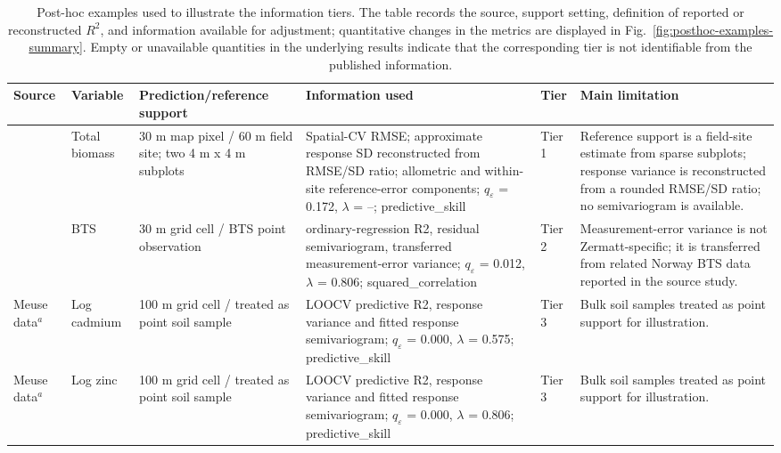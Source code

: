 \begin{table}[t]
\centering
\footnotesize
\caption{Post-hoc examples used to illustrate the information tiers. The table records the source, support setting, definition of reported or reconstructed $R^2$, and information available for adjustment; quantitative changes in the metrics are displayed in Fig.~\ref{fig:posthoc-examples-summary}. Empty or unavailable quantities in the underlying results indicate that the corresponding tier is not identifiable from the published information.}
\label{tab:posthoc-examples-overview}
\begin{tabular}{p{} p{} p{} p{} p{} p{}}
\hline
Source & Variable & Prediction/reference support & Information used & Tier & Main limitation \\
\hline
\citet{zandler2015dwarf} & Total biomass & 30 m map pixel / 60 m field site; two 4 m x 4 m subplots & Spatial-CV RMSE; approximate response SD reconstructed from RMSE/SD ratio; allometric and within-site reference-error components; $q_{\varepsilon}$ = 0.172, $\lambda$ = --; predictive\_skill & Tier 1 & Reference support is a field-site estimate from sparse subplots; response variance is reconstructed from a rounded RMSE/SD ratio; no semivariogram is available. \\
\citet{brenning2005bts} & BTS & 30 m grid cell / BTS point observation & ordinary-regression R2, residual semivariogram, transferred measurement-error variance; $q_{\varepsilon}$ = 0.012, $\lambda$ = 0.806; squared\_correlation & Tier 2 & Measurement-error variance is not Zermatt-specific; it is transferred from related Norway BTS data reported in the source study. \\
Meuse data$^{a}$ & Log cadmium & 100 m grid cell / treated as point soil sample & LOOCV predictive R2, response variance and fitted response semivariogram; $q_{\varepsilon}$ = 0.000, $\lambda$ = 0.575; predictive\_skill & Tier 3 & Bulk soil samples treated as point support for illustration. \\
Meuse data$^{a}$ & Log zinc & 100 m grid cell / treated as point soil sample & LOOCV predictive R2, response variance and fitted response semivariogram; $q_{\varepsilon}$ = 0.000, $\lambda$ = 0.806; predictive\_skill & Tier 3 & Bulk soil samples treated as point support for illustration. \\

\end{tabular}
\end{table}
